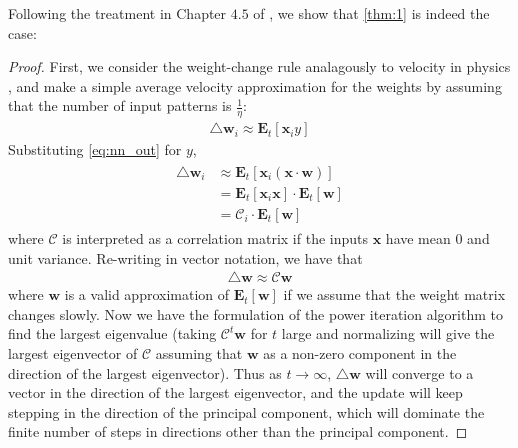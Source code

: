 \documentclass[12pt, usenames]{article}
\theoremstyle{definition}
\theoremstyle{definition}
\theoremstyle{definition}
\newcommand{\E}[2]
{\textbf{E}_{#1}\left[{#2}\right]}
\newcommand{\mc}[1]
{\mathcal{#1}}
\newcommand{\vv}[1]
{\textbf{#1}}
\begin{document}
Following the treatment in Chapter $4.5$ of \cite{OReilly}, we show that \autoref{thm:1} is indeed the case:
\begin{proof}
First, we consider the weight-change rule analagously to velocity in physics \cite{Seung}, and make a simple average velocity approximation for the weights by assuming that the number of input patterns is $\frac{1}{\eta}$:
\begin{align}
\triangle \vv{w}_{i} \approx \E{t}{\vv{x}_i y}
\end{align}
Substituting \autoref{eq:nn_out} for $y$, 
\begin{align}
\begin{split}
\triangle \vv{w}_{i} &\approx \E{t}{\vv{x}_i \left(\vv{x} \cdot \vv{w}\right)}
\\
&= \E{t}{\vv{x}_i\vv{x}} \cdot \E{t}{\vv{w}}
\\
&= \mc{C}_i \cdot \E{t}{\vv{w}}
\end{split}
\end{align}
where $\mc{C}$ is interpreted as a correlation matrix if the inputs $\vv{x}$ have mean $0$ and unit variance. Re-writing in vector notation, we have that
\begin{align}
\triangle \vv{w} \approx \mc{C}\vv{w}
\end{align}
where $\vv{w}$ is a valid approximation of $\E{t}{\vv{w}}$ if we assume that the weight matrix changes slowly. Now we have the formulation of the power iteration algorithm to find the largest eigenvalue (taking $\mc{C}^t\vv{w}$ for $t$ large and normalizing will give the largest eigenvector of $\mc{C}$ assuming that $\vv{w}$ as a non-zero component in the direction of the largest eigenvector). Thus as $t \to \infty$, $\triangle \vv{w}$ will converge to a vector in the direction of the largest eigenvector, and the update will keep stepping in the direction of the principal component, which will dominate the finite number of steps in directions other than the principal component. 
\end{proof}
\end{document}
